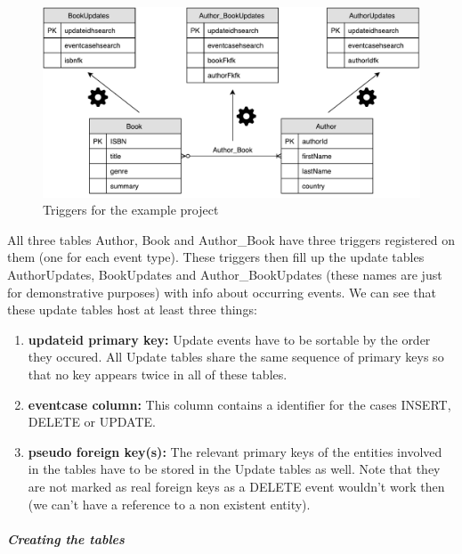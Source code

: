 \pagebreak

\begin{figure}[ht]
	\centering
	\includegraphics[scale=0.6]{images/Triggers_Schema.pdf}
	\caption{Triggers for the example project}
	\label{triggers_schema}
\end{figure}
\noindent
All three tables Author, Book and Author\_Book have three triggers registered on them (one for each event type). These triggers then fill up the update tables AuthorUpdates, BookUpdates and Author\_BookUpdates (these names are just for demonstrative purposes) with info about occurring events. We can see that these update tables host at least three things:

\begin{enumerate}
	\item \textbf{updateid primary key:} Update events have to be sortable by the order they occured. All Update tables share the same sequence of primary keys so that no key appears twice in all of these tables.
	\item \textbf{eventcase column:} This column contains a identifier for the cases INSERT, DELETE or UPDATE.
	\item \textbf{pseudo foreign key(s):} The relevant primary keys of the entities involved in the tables have to be stored in the Update tables as well. Note that they are not marked as real foreign keys as a DELETE event wouldn't work then (we can't have a reference to a non existent entity).
\end{enumerate}

\subparagraph{Creating the tables} \label{creating_the_tables}

